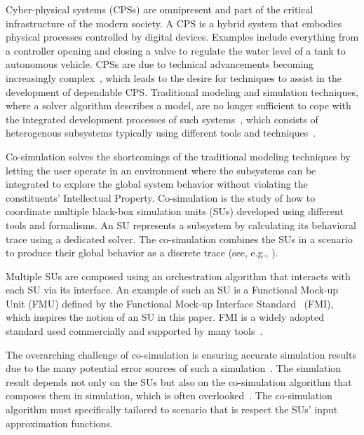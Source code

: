 Cyber-physical systems (CPSs) are omnipresent and part of the critical infrastructure of the modern society.
A CPS is a hybrid system that embodies physical processes controlled by digital devices. Examples include everything from a controller opening and closing a valve to regulate the water level of a tank to autonomous vehicle.
CPSs are due to technical advancements becoming increasingly complex~\cite{4519604}, which leads to the desire for techniques to assist in the development of dependable CPS.
Traditional modeling and simulation techniques, where a solver algorithm describes a model, are no longer sufficient to cope with the integrated development processes of such systems~\cite{FMI2014}, which consists of heterogenous subsystems typically using different tools and techniques~\cite{Monti_2021}. 

Co-simulation solves the shortcomings of the traditional modeling techniques by letting the user operate in an environment where the subsystems can be integrated to explore the global system behavior without violating the constituents' Intellectual Property\cite{Gomes2018}. 
Co-simulation is the study of how to coordinate multiple black-box simulation units (SUs) developed using different tools and formalisms.
An SU represents a subsystem by calculating its behavioral trace using a dedicated solver.
The co-simulation combines the SUs in a scenario to produce their global behavior as a discrete trace (see, e.g., \cite{Kubler2000}).

Multiple SUs are composed using an orchestration algorithm that interacts with each SU via its interface.
An example of such an SU is a Functional Mock-up Unit (FMU) defined by the Functional Mock-up Interface Standard~\cite{FMI2014} (FMI), which inspires the notion of an SU in this paper. 
FMI is a widely adopted standard used commercially and supported by many tools~\cite{Tools_FMI}.

The overarching challenge of co-simulation is ensuring accurate simulation results due to the many potential error sources of such a simulation~\cite{Gomes2018}.
The simulation result depends not only on the SUs but also on the co-simulation algorithm that composes them in simulation, which is often overlooked~\cite{Gomes2019,Oakes2021,Gomes2018f,Schweizer2015c,hansen_verification_2021}.
The co-simulation algorithm must specifically tailored to scenario that is respect the SUs' input approximation functions.


